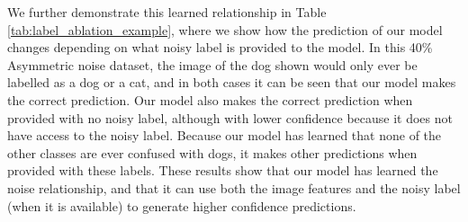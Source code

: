 \documentclass[10pt,twocolumn,letterpaper]{article}
\begin{document}
We further demonstrate this learned relationship in Table \ref{tab:label_ablation_example}, where we show how the prediction of our model changes depending on what noisy label is provided to the model. In this 40\% Asymmetric noise dataset, the image of the dog shown would only ever be labelled as a dog or a cat, and in both cases it can be seen that our model makes the correct prediction. Our model also makes the correct prediction when provided with no noisy label, although with lower confidence because it does not have access to the noisy label. Because our model has learned that none of the other classes are ever confused with dogs, it makes other predictions when provided with these labels. These results show that our model has learned the noise relationship, and that it can use both the image features and the noisy label (when it is available) to generate higher confidence predictions.
\end{document}
